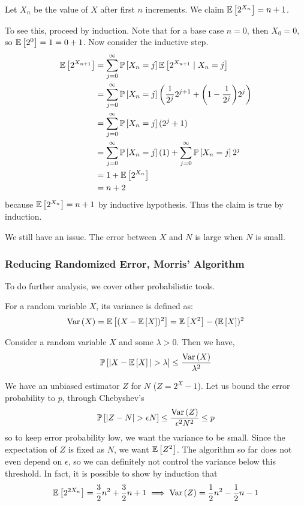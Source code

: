 \begin{theorem}
    Let $X_n$ be the value of $X$ after first $n$ increments. We claim $\mathbb{E}\left[ 2^{X_n} \right] = n + 1$.
    \begin{proof*}
    To see this, proceed by induction. Note that for a base case $n = 0$, then $X_0 = 0$, so $\mathbb{E}\left[ 2^0 \right] = 1 = 0 + 1$.
    Now consider the inductive step.
    \begin{align*}
        \mathbb{E}\left[ 2^{X_{n + 1}} \right] &= \sum_{j = 0}^{\infty} \mathbb{P}\left[ X_n = j \right] \mathbb{E}\left[ 2^{X_{n + 1}}\mid X_n = j \right] \\
        &= \sum_{j = 0}^{\infty} \mathbb{P}\left[ X_n = j \right] \qty(\frac{1}{2^j} 2^{j + 1} + \qty(1 - \frac{1}{2^j}) 2^j) \\
        &= \sum_{j = 0}^{\infty} \mathbb{P}\left[ X_n = j \right] (2^j + 1) \\
        &= \sum_{j = 0}^{\infty} \mathbb{P}\left[ X_n = j \right] (1) + \sum_{j = 0}^{\infty} \mathbb{P}\left[ X_n = j \right] 2^j \\
        &= 1 + \mathbb{E}\left[ 2^{X_n} \right] \\
        &= n + 2
    \end{align*}
    because  $\mathbb{E}\left[ 2^{X_n} \right] = n + 1$ by inductive hypothesis. Thus the claim is true by induction.

    We still have an issue. The error between $X$ and $N$ is large when $N$ is small.
    \end{proof*}
\end{theorem}

\subsubsection{Reducing Randomized Error, Morris' Algorithm}

To do further analysis, we cover other probabilistic tools.

\begin{definition}[Variance]
    For a random variable $X$, its variance is defined as:
    \[ \text{Var}\left( X \right) = \mathbb{E}\left[ (X - \mathbb{E}\left[ X \right])^2 \right] = \mathbb{E}\left[ X^2 \right] - (\mathbb{E}\left[ X \right])^2 \]
\end{definition}

\begin{theorem}
    Consider a random variable $X$ and some $\lambda > 0$. Then we have,
    \[ \mathbb{P}\left[ |X - \mathbb{E}\left[ X \right]| > \lambda \right] \leq \frac{\text{Var}\left( X \right)}{\lambda^2} \]
\end{theorem}

We have an unbiased estimator $Z$ for $N$ ($Z = 2^X - 1$). Let us bound the error probability to $p$, through Chebyshev's
\[ \mathbb{P}\left[ |Z - N| > \epsilon N \right] \leq \frac{\text{Var}\left( Z \right)}{\epsilon^2 N^2} \leq p \]
so to keep error probability low, we want the variance to be small. Since the expectation of $Z$ is fixed as $N$, we want $\mathbb{E}\left[ Z^2 \right]$.
The algorithm so far does not even depend on $\epsilon$, so we can definitely not control the variance below this threshold. In fact,
it is possible to show by induction that
\[ \mathbb{E}\left[ 2^{2X_n} \right] = \frac32 n^2 + \frac32 n + 1 \implies \text{Var}\left( Z \right) = \frac12 n^2 - \frac12 n - 1 \]

